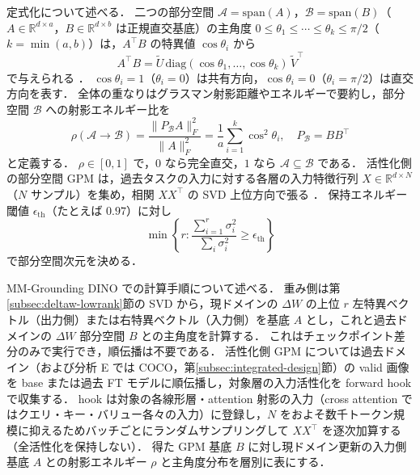 定式化について述べる．
二つの部分空間 $\mathcal{A} = \mathrm{span}(A)$，$\mathcal{B} = \mathrm{span}(B)$（$A \in \mathbb{R}^{d \times a}$，$B \in \mathbb{R}^{d \times b}$ は正規直交基底）の主角度 $0 \leq \theta_1 \leq \cdots \leq \theta_k \leq \pi/2$（$k = \min(a,b)$）は，$A^{\top} B$ の特異値 $\cos\theta_i$ から
\begin{equation}
A^{\top} B = \tilde{U} \, \mathrm{diag}(\cos\theta_1, \ldots, \cos\theta_k) \, \tilde{V}^{\top}
\end{equation}
で与えられる \cite{gpm}．
$\cos\theta_i = 1$（$\theta_i = 0$）は共有方向，$\cos\theta_i = 0$（$\theta_i = \pi/2$）は直交方向を表す．
全体の重なりはグラスマン射影距離やエネルギーで要約し，部分空間 $\mathcal{B}$ への射影エネルギー比を
\begin{equation}
\rho(\mathcal{A} \rightarrow \mathcal{B}) = \frac{\| P_{\mathcal{B}} A \|_F^2}{\| A \|_F^2} = \frac{1}{a}\sum_{i=1}^{k} \cos^2 \theta_i, \quad P_{\mathcal{B}} = B B^{\top}
\end{equation}
と定義する．
$\rho \in [0,1]$ で，$0$ なら完全直交，$1$ なら $\mathcal{A} \subseteq \mathcal{B}$ である．
活性化側の部分空間 GPM は，過去タスクの入力に対する各層の入力特徴行列 $X \in \mathbb{R}^{d \times N}$（$N$ サンプル）を集め，相関 $X X^{\top}$ の SVD 上位方向で張る \cite{gpm}．
保持エネルギー閾値 $\epsilon_{\mathrm{th}}$（たとえば $0.97$）に対し
\begin{equation}
\min \left\{ r : \frac{\sum_{i=1}^{r} \sigma_i^2}{\sum_{i} \sigma_i^2} \geq \epsilon_{\mathrm{th}} \right\}
\end{equation}
で部分空間次元を決める．

MM-Grounding DINO での計算手順について述べる．
重み側は第\ref{subsec:deltaw-lowrank}節の SVD から，現ドメインの $\Delta W$ の上位 $r$ 左特異ベクトル（出力側）または右特異ベクトル（入力側）を基底 $A$ とし，これと過去ドメインの $\Delta W$ 部分空間 $B$ との主角度を計算する．
これはチェックポイント差分のみで実行でき，順伝播は不要である．
活性化側 GPM については過去ドメイン（および分析 E では COCO，第\ref{subsec:integrated-design}節）の valid 画像を base または過去 FT モデルに順伝播し，対象層の入力活性化を forward hook で収集する．
hook は対象の各線形層・attention 射影の入力（cross attention ではクエリ・キー・バリュー各々の入力）に登録し，$N$ をおよそ数千トークン規模に抑えるためバッチごとにランダムサンプリングして $X X^{\top}$ を逐次加算する（全活性化を保持しない）．
得た GPM 基底 $B$ に対し現ドメイン更新の入力側基底 $A$ との射影エネルギー $\rho$ と主角度分布を層別に表にする．

